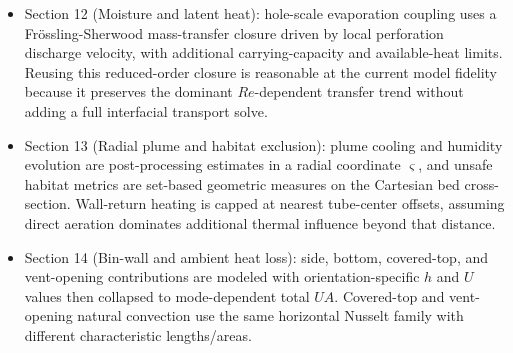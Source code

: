 \documentclass[11pt]{article}
\begin{document}
\begin{itemize}[leftmargin=*]
\item Section 12 (Moisture and latent heat): hole-scale evaporation coupling uses a Fr\"ossling-Sherwood mass-transfer closure driven by local perforation discharge velocity, with additional carrying-capacity and available-heat limits. Reusing this reduced-order closure is reasonable at the current model fidelity because it preserves the dominant \(Re\)-dependent transfer trend without adding a full interfacial transport solve.
\item Section 13 (Radial plume and habitat exclusion): plume cooling and humidity evolution are post-processing estimates in a radial coordinate \(\varsigma\), and unsafe habitat metrics are set-based geometric measures on the Cartesian bed cross-section. Wall-return heating is capped at nearest tube-center offsets, assuming direct aeration dominates additional thermal influence beyond that distance.
\item Section 14 (Bin-wall and ambient heat loss): side, bottom, covered-top, and vent-opening contributions are modeled with orientation-specific \(h\) and \(U\) values then collapsed to mode-dependent total \(UA\). Covered-top and vent-opening natural convection use the same horizontal Nusselt family with different characteristic lengths/areas.
\end{itemize}
\end{document}
